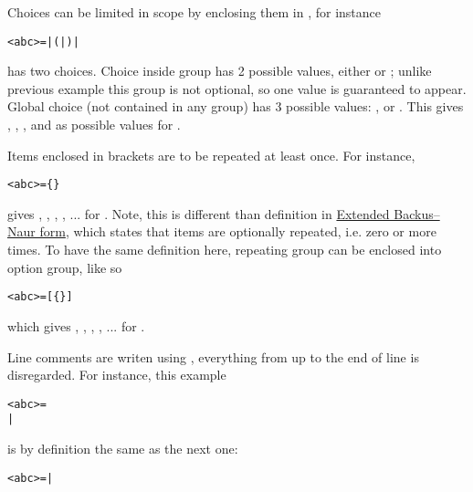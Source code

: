 Choices can be limited in scope by enclosing them in \algfmt{( )},
for instance
\begin{alltt}
<abc> =  |  (  |  )  | 
\end{alltt}
has two choices. Choice inside group \algfmt{( )} has 2 possible values,
either  or ; unlike previous example this group is not optional, so one
value is guaranteed to appear. Global choice (not contained in any group) has 3 possible
values: , \algfmt{(}\algfmt{|}\algfmt{)}
or . This gives , , , and  as possible values
for .

Items enclosed in \algfmt{\{ \}} brackets are to be repeated at least once. For instance,
\begin{alltt}
<abc> =  \{  \} 
\end{alltt}
gives , , , , ... for . \newline
\indent
Note, this is different than definition in
\href{https://en.wikipedia.org/wiki/Extended_Backus%E2%80%93Naur_form#Table_of_symbols}{Extended Backus–Naur form},
which states that items are optionally repeated, i.e. zero or more times. \newline
\indent
To have the same definition here, repeating group can be enclosed into option group,
like so
\begin{alltt}
<abc> =  [ \{  \} ] 
\end{alltt}
which gives , , , , ... for .

Line comments are writen using \algfmti{\$}, everything from \algfmti{\$} up to the
end of line is disregarded. For instance, this example
\begin{alltt}
<abc> = 
   
|  
\end{alltt}
is by definition the same as the next one:
\begin{alltt}
<abc> =  | 
\end{alltt}

